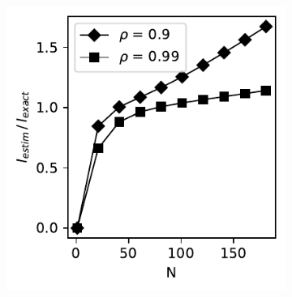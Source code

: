 \documentclass[../Thesis.tex]{subfiles}
\begin{document}
\begin{figure}[H]
\begin{subfigure}[t]{0.32\textwidth}
        \caption{}
    \end{subfigure}%
    ~
    \begin{subfigure}[t]{0.32\textwidth}
        \centering
        \includegraphics[width=\linewidth]{figures/ND examples/MI calc/gaussian example original high corr - M-spline - relative error.pdf}
        \caption{}
    \end{subfigure}
    \caption{}
    \label{fig:M-spline approach results MI - relative error}
\end{figure}
\end{document}
